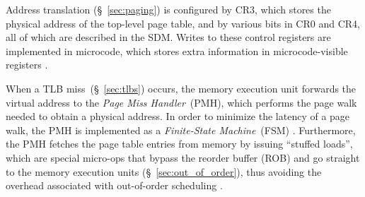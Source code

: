 
Address translation (\S~\ref{sec:paging}) is configured by CR3, which stores
the physical address of the top-level page table, and by various bits in CR0
and CR4, all of which are described in the SDM. Writes to these control
registers are implemented in microcode, which stores extra information in
microcode-visible registers \cite{intel2009pipeline}.


When a TLB miss~(\S~\ref{sec:tlbs}) occurs, the memory execution unit forwards
the virtual address to the \textit{Page Miss Handler}~(PMH), which performs the
page walk needed to obtain a physical address. In order to minimize the latency
of a page walk, the PMH is implemented as a \textit{Finite-State Machine}~(FSM)
\cite{hildesheim2014ptm, raikin2014tlb}. Furthermore, the PMH fetches the
page table entries from memory by issuing ``stuffed loads'', which are special
micro-ops that bypass the reorder buffer (ROB) and go straight to the memory
execution units (\S~\ref{sec:out_of_order}), thus avoiding the overhead
associated with out-of-order scheduling
\cite{intel1997pmh, intel1997microspace, hildesheim2014ptm}.


